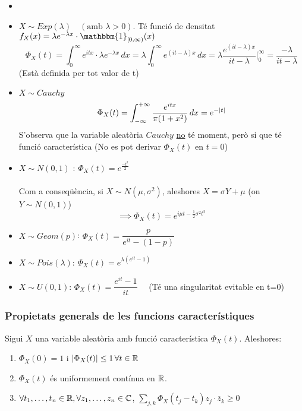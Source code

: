 \begin{example}
  \begin{itemize}
      \item[]
      \item $X\sim Exp(\lambda) \quad (\text{amb } \lambda > 0)$. Té funció de densitat 
      $f_{X}(x) = \lambda e^{-\lambda x}\cdot \mathbbm{1}_{[0, \infty)}(x)$
      \[
        \Phi_{X}(t) = \int_{0}^{\infty}e^{itx}\cdot\lambda e^{-\lambda x} \, dx = \lambda\int_{0}^{\infty}e^{(it-\lambda)x} \, dx = \lambda\frac{e^{(it-\lambda)x}}{it-\lambda}\bigg|_{0}^{\infty} = \frac{-\lambda}{it-\lambda}
      \]
      (Està definida per tot valor de t)
      \item $X\sim Cauchy$
      \[
        \Phi_{X}(t) = \int_{-\infty}^{+\infty}\frac{e^{itx}}{\pi(1+x^{2})} \, dx = e^{-\left\vert t \right\vert}
      \]
      S'observa que la variable aleatòria $Cauchy$ \underline{no} té moment, però si que 
      té funció característica (No es pot derivar $\Phi_{X}(t)$ en $t=0$)
      \item $X\sim N(0,1)$ : $\Phi_{X}(t) = e^{\frac{-t^{2}}{2}}$ \\\\
      Com a conseqüència, si $X\sim N(\mu, \sigma^{2})$, aleshores $X=\sigma Y + \mu$ (on $Y\sim N(0,1)$)
      \[
        \implies \Phi_{X}(t) = e^{i\mu t - \frac{1}{2}\sigma^{2}t^{2}}
      \]
      
      \item $X\sim Geom(p)$: $\Phi_{X}(t) = \dfrac{p}{e^{it}-(1-p)}$
      \item $X\sim Pois(\lambda)$: $\Phi_{X}(t) = e^{\lambda(e^{it}-1)}$
      \item $X\sim U(0,1)$: $\Phi_{X}(t) = \dfrac{e^{it}-1}{it} \quad$ (Té una singularitat evitable en t=0)
  \end{itemize}
\end{example}

\subsubsection{Propietats generals de les funcions característiques}
\begin{prop}
  Sigui $X$ una variable aleatòria amb funció característica $\Phi_{X}(t)$. Aleshores:
  \begin{enumerate}
      \item $\Phi_{X}(0)=1$ i $\left\vert \Phi_{X}(t) \right\vert\leq 1 \, \forall t\in\mathbb{R}$
      \item $\Phi_{X}(t)$ és uniformement contínua en $\mathbb{R}$.
      \item $\forall t_{1},\ldots,t_{n} \in \mathbb{R}, \forall z_{1},\ldots,z_{n}\in\mathbb{C}$, $\sum\limits_{j,k}\Phi_{X}(t_{j}-t_{k})z_{j}\cdot \overline{z}_{k}\geq0$
  \end{enumerate}
\end{prop}

